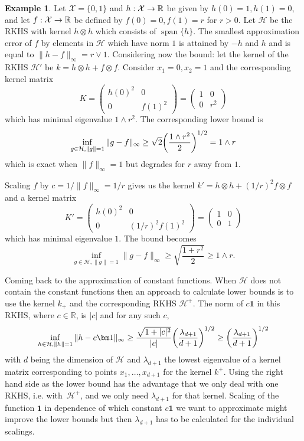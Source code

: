 \documentclass[10pt]{amsart}
\theoremstyle{definition}\newtheorem{defi}[theo]{Definition}\newtheorem{rema}[theo]{Remark}\newtheorem{exam}[theo]{Example}\newtheorem{exem}[theo]{Example}\newtheorem{nota}[theo]{Notation}
\theoremstyle{remark}
\DeclareMathOperator{\spn}{span}
\newcommand{\R}{\mathbb{R}}
\newcommand{\X}{\mathcal{X}}
\newcommand{\cH}{\mathcal{H}}
\renewcommand*{\to}{\mathchoice{\longrightarrow}{\rightarrow}{\rightarrow}{\rightarrow}}
\let\originalleft\left
\let\originalright\right
\renewcommand{\left}{\mathopen{}\mathclose\bgroup\originalleft}
\renewcommand{\right}{\aftergroup\egroup\originalright}
\begin{document}
\begin{exam}
Let $\X =\{0,1\}$ and $h:\X \to \R$ be given by $h(0)= 1, h(1) =0$, and let $f: \X \to \R$ be defined by $f(0) = 0, f(1) = r$ for $r > 0$. Let $\cH$ be the RKHS with kernel $h\otimes h$ which consists of $\spn \{h\}$. The smallest approximation error of $f$ by elements in $\cH$ which have norm $1$ is attained by $-h$ and $h$ and is equal to $\|h - f\|_\infty = r\vee 1$. Considering now the bound: let the kernel of the RKHS $\cH'$ be $k = h \otimes h + f \otimes f$. Consider $x_1= 0, x_2 =1$ and the corresponding kernel matrix
\[
K =
\begin{pmatrix}
h(0)^2 & 0 \\
0 & f(1)^2
\end{pmatrix} =
\begin{pmatrix}
1 & 0 \\
0 & r^2
\end{pmatrix}
\]
which has minimal eigenvalue $1 \wedge r^2$. The corresponding lower bound is
\[
\inf_{g\in \cH, \|g\|=1} \|g - f\|_\infty \geq \sqrt{2} \left(\frac{1 \wedge r^2}{2} \right)^{1/2} = 1 \wedge r
\]
which is exact when $\|f\|_\infty = 1$ but degrades for $r$ away from $1$.

Scaling $f$ by $c = 1/\|f\|_\infty = 1/r$ gives us the kernel $k' = h \otimes h + (1/r)^2 f\otimes f$ and a kernel matrix
\[
K' =
\begin{pmatrix}
h(0)^2 & 0 \\
0 & (1/r)^2 f(1)^2
\end{pmatrix} =
\begin{pmatrix}
1 & 0 \\
0 & 1
\end{pmatrix}
\]
which has minimal eigenvalue $1$. The bound becomes
\[
\inf_{g\in \cH, \|g\|=1} \|g - f\|_\infty \geq \sqrt{\frac{1 + r^2}{2} } \geq 1 \wedge r.
\]
\end{exam}

Coming back to the approximation of constant functions. When $\cH$ does not contain the constant functions then an approach to calculate lower bounds is to use the kernel $k_+$ and the corresponding RKHS $\cH^+$. The norm of $c \bm 1$ in this RKHS, where $c \in \R$, is $|c|$ and for any such $c$,
\[
\inf_{h \in \cH, \|h\|=1} \|h-c \bm 1\|_\infty \geq \frac{\sqrt{1 + |c|^2}}{|c|} \left(\frac{\lambda_{d+1}}{d+1}\right)^{1/2} \geq \left(\frac{\lambda_{d+1}}{d+1}\right)^{1/2}
\]
with $d$ being the dimension of $\cH$ and $\lambda_{d+1}$ the lowest eigenvalue of a kernel matrix corresponding to points $x_1,\dots,x_{d+1}$ for the kernel $k^+$. Using the right hand side as the lower bound has the advantage that we only deal with one RKHS, i.e. with~$\cH^+$, and we only need $\lambda_{d+1}$ for that kernel. Scaling of the function $\bm 1$ in dependence of which constant $c \bm 1$ we want to approximate might improve the lower bounds but then $\lambda_{d+1}$ has to be calculated for the individual scalings.
\end{document}
